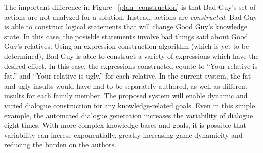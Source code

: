 \documentclass{article}
\begin{document}
The important difference in Figure ~\ref{plan_construction} is that Bad Guy's
set of actions are not analyzed for a solution.  Instead, actions are
\emph{constructed}.  Bad Guy is able to construct logical statements
that will change Good Guy's knowledge state.  In this case, the posisble
statements involve bad things said about Good Guy's relatives.  Using
an expression-construction algorithm (which is yet to be determined),
Bad Guy is able to construct a variety of expressions which have the
desired effect.  In this case, the expressions constructed equate to
``Your relative is fat.'' and ``Your relative is ugly.'' for each relative.
In the current system, the fat and ugly insults would have had to be separately
authored, as well as different insults for each family member.
The proposed system will enable dynamic and varied dialogue construction for any
knowledge-related goals.  Even in this simple example, the automated
dialogue generation increases the variability of dialogue eight times.
With more complex knowledge bases and goals, it is possible that
variability can increse exponentially, greatly increasing game
dynamicity and reducing the burden on the authors.


  







  
\end{document}
